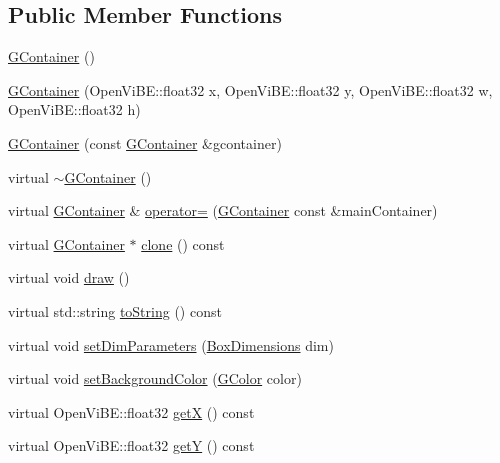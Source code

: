 \subsection*{Public Member Functions}
\begin{DoxyCompactItemize}
\item 
\hyperlink{classOpenViBEApplications_1_1GContainer_a2d39dc3bc687ca9385d5abbeeee46f7a}{GContainer} ()
\item 
\hyperlink{classOpenViBEApplications_1_1GContainer_a9bb080e67383d35afb5bd2dd77f2c5ab}{GContainer} (OpenViBE::float32 x, OpenViBE::float32 y, OpenViBE::float32 w, OpenViBE::float32 h)
\item 
\hyperlink{classOpenViBEApplications_1_1GContainer_a512a093d0ca5198a79d3fa002364a635}{GContainer} (const \hyperlink{classOpenViBEApplications_1_1GContainer}{GContainer} \&gcontainer)
\item 
virtual \hyperlink{classOpenViBEApplications_1_1GContainer_ac4b396ed7b0a56a4bcf8cf7fc96c8460}{$\sim$GContainer} ()
\item 
virtual \hyperlink{classOpenViBEApplications_1_1GContainer}{GContainer} \& \hyperlink{classOpenViBEApplications_1_1GContainer_adbd1791e9cc45bc8cd4d4f56e7654eb5}{operator=} (\hyperlink{classOpenViBEApplications_1_1GContainer}{GContainer} const \&mainContainer)
\item 
virtual \hyperlink{classOpenViBEApplications_1_1GContainer}{GContainer} $\ast$ \hyperlink{classOpenViBEApplications_1_1GContainer_a5a65050110f1e269905e2de75f281695}{clone} () const 
\item 
virtual void \hyperlink{classOpenViBEApplications_1_1GContainer_a5ae508ebbc61d807143db96ee2f96883}{draw} ()
\item 
virtual std::string \hyperlink{classOpenViBEApplications_1_1GContainer_afa60cc492f0ef420e2082289b2f979e5}{toString} () const 
\item 
virtual void \hyperlink{classOpenViBEApplications_1_1GContainer_ab02678f9c301ae4e78ca2514a062c645}{setDimParameters} (\hyperlink{structOpenViBEApplications_1_1__BoxDimensions}{BoxDimensions} dim)
\item 
virtual void \hyperlink{classOpenViBEApplications_1_1GContainer_a631837d494a76d2c2ed56f72d8d39d0b}{setBackgroundColor} (\hyperlink{structOpenViBEApplications_1_1GColor}{GColor} color)
\item 
virtual OpenViBE::float32 \hyperlink{classOpenViBEApplications_1_1GContainer_a156b7d6c6f01e35b632b46a20ad3290e}{getX} () const 
\item 
virtual OpenViBE::float32 \hyperlink{classOpenViBEApplications_1_1GContainer_afa4adbd9ae77d80f7110f8fda52445b5}{getY} () const 

\end{DoxyCompactItemize}
